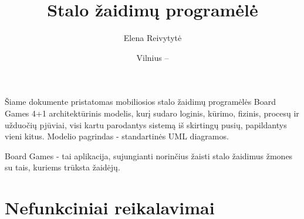 \documentclass{VUMIFPSkursinis}
\title{Stalo žaidimų programėlė}
\author{Elena Reivytytė}
\date{Vilnius – \the\year}
\begin{document}
\maketitle

Šiame dokumente pristatomas mobiliosios stalo žaidimų programėlės Board Games 4+1 architektūrinis
modelis, kurį sudaro loginis, kūrimo, fizinis, procesų ir užduočių pjūviai, visi kartu parodantys
sistemą iš skirtingų pusių, papildantys vieni kitus. Modelio pagrindas - standartinės UML diagramos.

\tableofcontents

Board Games - tai aplikacija, sujungianti norinčius žaisti stalo žaidimus žmones
su tais, kuriems trūksta žaidėjų. 


\section{Nefunkciniai reikalavimai}

\newcommand\rownumber{\stepcounter{nfrcount}\arabic{nfrcount}}
\end{document}
